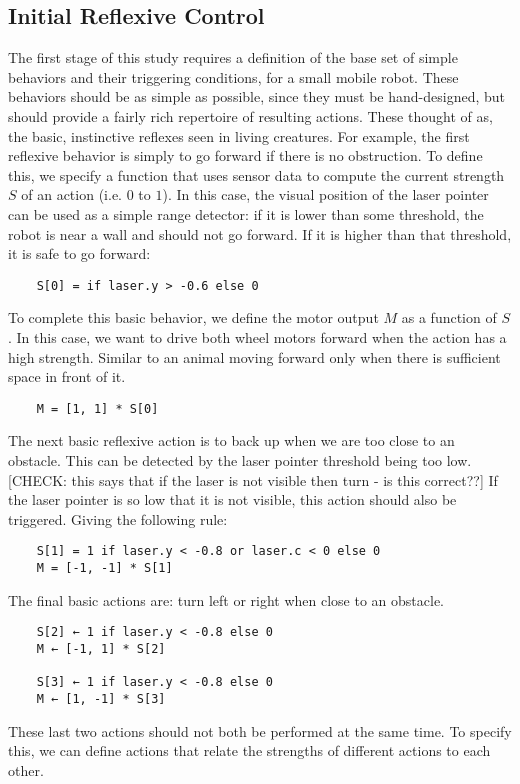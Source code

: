 \documentclass[conference]{IEEEtran}
\begin{document}
\subsection{Initial Reflexive Control}
The first stage of this study requires a definition of the base set of simple behaviors and their triggering conditions, for a small mobile robot. These behaviors should be as simple as possible, since they must be hand-designed, but should provide a fairly rich repertoire of resulting actions. These thought of as, the basic, instinctive reflexes seen in living creatures. For example, the first reflexive behavior is simply to go forward if there is no obstruction. To define this, we specify a function that uses sensor data to compute the current strength $S$ of an action (i.e. $0$ to $1$). In this case, the visual position of the laser pointer can be used as a simple range detector: if it is lower than some threshold, the robot is near a wall and should not go forward. If it is higher than that threshold, it is safe to go forward: 
\begin{lstlisting}
	S[0] = if laser.y > -0.6 else 0
\end{lstlisting}
To complete this basic behavior, we define the motor output $M$ as a function of $S$. In this case, we want to drive both wheel motors forward when the action has a high strength. Similar to an animal moving forward only when there is sufficient space in front of it.
\begin{lstlisting}
	M = [1, 1] * S[0]
\end{lstlisting}
The next basic reflexive action is to back up when we are too close to an obstacle. This can be detected by the laser pointer threshold being too low. [CHECK: this says that if the laser is not visible then turn - is this correct??] If the laser pointer is so low that it is not visible, this action should also be triggered. Giving the following rule:
\begin{lstlisting}
	S[1] = 1 if laser.y < -0.8 or laser.c < 0 else 0
	M = [-1, -1] * S[1]
\end{lstlisting}
The final basic actions are: turn left or right when close to an obstacle. 
\begin{lstlisting}
	S[2] ← 1 if laser.y < -0.8 else 0
	M ← [-1, 1] * S[2]

	S[3] ← 1 if laser.y < -0.8 else 0
	M ← [1, -1] * S[3]
\end{lstlisting}
These last two actions should not both be performed at the same time. To specify this, we can define actions that relate the strengths of different actions to each other.
\end{document}
